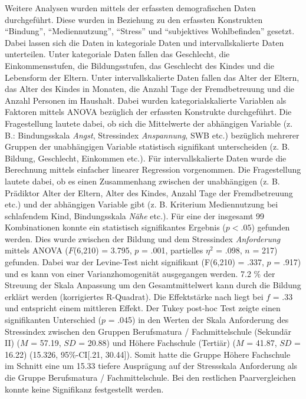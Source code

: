 Weitere Analysen wurden mittels der erfassten demografischen Daten durchgeführt. Diese wurden in Beziehung zu den erfassten Konstrukten \enquote{Bindung}, \enquote{Mediennutzung}, \enquote{Stress} und \enquote{subjektives Wohlbefinden} gesetzt. Dabei lassen sich die Daten in kategoriale Daten und intervall\-skalierte Daten unterteilen. Unter kategoriale Daten fallen das Geschlecht, die Einkommensstufen, die Bildungsstufen, das Geschlecht des Kindes und die Lebensform der Eltern. Unter intervall\-skalierte Daten fallen das Alter der Eltern, das Alter des Kindes in Monaten, die Anzahl Tage der Fremdbetreuung und die Anzahl Personen im Haushalt. Dabei wurden kategorial\-skalierte Variablen als Faktoren mittels ANOVA bezüglich der erfassten Konstrukte durchgeführt. Die Fragestellung lautete dabei, ob sich die Mittelwerte der abhängigen Variable (z. B.: Bindungsskala \textit{Angst}, Stressindex \textit{Anspannung}, SWB etc.) bezüglich mehrerer Gruppen der unabhängigen Variable statistisch signifikant unterscheiden  (z. B. Bildung, Geschlecht, Einkommen etc.). Für intervall\-skalierte Daten wurde die Berechnung mittels einfacher linearer Regression vorgenommen. Die Fragestellung lautete dabei, ob es einen Zusammenhang zwischen der unabhängigen (z. B. Prädiktor Alter der Eltern, Alter des Kindes, Anzahl Tage der Fremdbetreuung etc.) und der abhängigen Variable gibt (z. B. Kriterium Mediennutzung bei schlafendem Kind, Bindungsskala \textit{Nähe} etc.). Für eine der insgesamt 99 Kombinationen konnte ein statistisch signifikantes Ergebnis ($p<.05$) gefunden werden. Dies wurde zwischen der Bildung und dem Stressindex \textit{Anforderung} mittels ANOVA ($F$(6,210) = 3.795, $p$ = .001, partielles $\eta^2$ = .098, $n$ = 217) gefunden. Dabei war der Levine-Test nicht signifikant (F(6,210) = .337, $p$ = .917) und es kann von einer Varianzhomogenität ausgegangen werden. 7.2 \% der Streuung der Skala Anpassung um den Gesamtmittelwert kann durch die Bildung erklärt werden (korrigiertes R-Quadrat). Die Effektstärke nach  liegt bei $f$ = .33 und entspricht einem mittleren Effekt. Der Tukey post-hoc Test zeigte einen signifikanten Unterschied ($p$ = .045) in den Werten der Skala Anforderung des Stressindex zwischen den Gruppen Berufsmatura / Fachmittelschule (Sekundär II) ($M$ = 57.19, $SD$ = 20.88) und Höhere Fachschule (Tertiär) ($M$ = 41.87, $SD$ = 16.22) (15.326, 95\%-CI[.21, 30.44]). Somit hatte die Gruppe Höhere Fachschule im Schnitt eine um 15.33 tiefere Ausprägung auf der Stressskala Anforderung als die Gruppe Berufsmatura / Fachmittelschule. Bei den restlichen Paarvergleichen konnte keine Signifikanz festgestellt werden.

